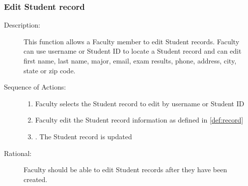    \subsubsection{\large Edit Student record} 
   \begin{boxed} %
      \begin{description}
         \item[Description:\label{desc:edit_record}]
      This function allows a Faculty member to edit Student records. Faculty can
      use username or Student ID to locate a Student record and can edit first
      name, last name, major, email, exam results, phone, address, city, state
      or zip code.
         
            \item[Sequence of Actions:]\hspace{10cm}
         \begin{enumerate}
            \item Faculty selects the Student record to edit by username or
               Student ID
            \item Faculty edit the Student record information as defined in
               \ref{def:record}
            \item. The Student record is updated
      \end{enumerate}

            \item[Rational:]
         Faculty should be able to edit Student records after they have been created.
      \end{description}
   \end{boxed} %

